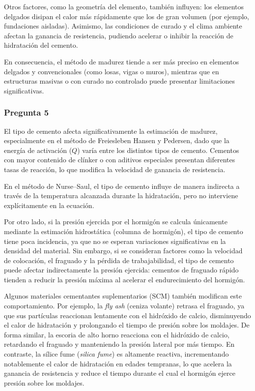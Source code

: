 Otros factores, como la geometría del elemento, también influyen: los elementos delgados disipan el calor más rápidamente que los de gran volumen (por ejemplo, fundaciones aisladas).  
Asimismo, las condiciones de curado y el clima ambiente afectan la ganancia de resistencia, pudiendo acelerar o inhibir la reacción de hidratación del cemento.  

En consecuencia, el método de madurez tiende a ser más preciso en elementos delgados y convencionales (como losas, vigas o muros), mientras que en estructuras masivas o con curado no controlado puede presentar limitaciones significativas.

\subsubsection*{Pregunta 5} 

El tipo de cemento afecta significativamente la estimación de madurez, especialmente en el método de Freiesleben Hansen y Pedersen, dado que la energía de activación ($Q$) varía entre los distintos tipos de cemento.  
Cementos con mayor contenido de clínker o con aditivos especiales presentan diferentes tasas de reacción, lo que modifica la velocidad de ganancia de resistencia.  

En el método de Nurse–Saul, el tipo de cemento influye de manera indirecta a través de la temperatura alcanzada durante la hidratación, pero no interviene explícitamente en la ecuación.

Por otro lado, si la presión ejercida por el hormigón se calcula únicamente mediante la estimación hidrostática (columna de hormigón), el tipo de cemento tiene poca incidencia, ya que no se esperan variaciones significativas en la densidad del material.  
Sin embargo, si se consideran factores como la velocidad de colocación, el fraguado y la pérdida de trabajabilidad, el tipo de cemento puede afectar indirectamente la presión ejercida: cementos de fraguado rápido tienden a reducir la presión máxima al acelerar el endurecimiento del hormigón.

Algunos materiales cementantes suplementarios (SCM) también modifican este comportamiento. Por ejemplo, la \textit{fly ash} (ceniza volante) retrasa el fraguado, ya que sus partículas reaccionan lentamente con el hidróxido de calcio, disminuyendo el calor de hidratación y prolongando el tiempo de presión sobre los moldajes.  
De forma similar, la escoria de alto horno reacciona con el hidróxido de calcio, retardando el fraguado y manteniendo la presión lateral por más tiempo.  
En contraste, la sílice fume (\textit{silica fume}) es altamente reactiva, incrementando notablemente el calor de hidratación en edades tempranas, lo que acelera la ganancia de resistencia y reduce el tiempo durante el cual el hormigón ejerce presión sobre los moldajes.


